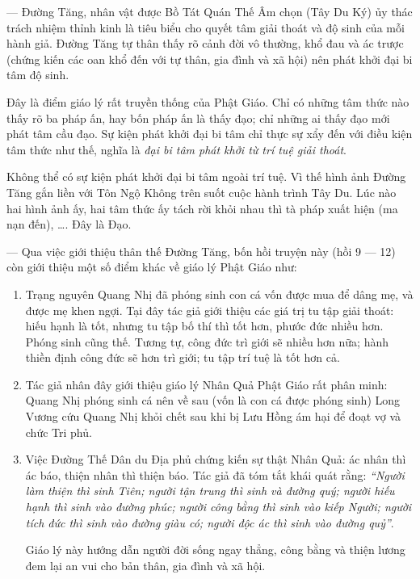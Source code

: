 --- Đường Tăng, nhân vật được Bồ Tát Quán Thế Âm chọn (Tây Du Ký) ủy thác trách nhiệm thỉnh kinh là tiêu biểu cho quyết tâm giải thoát và độ sinh của mỗi hành giả. Đường Tăng tự thân thấy rõ cảnh đời vô thường, khổ đau và ác trược (chứng kiến các oan khổ đến với tự thân, gia đình và xã hội) nên phát khởi đại bi tâm độ sinh.

Đây là điểm giáo lý rất truyền thống của Phật Giáo. Chỉ có những tâm thức nào thấy rõ ba pháp ấn, hay bốn pháp ấn là thấy đạo; chỉ những ai thấy đạo mới phát tâm cầu đạo. Sự kiện phát khởi đại bi tâm chỉ thực sự xẩy đến với điều kiện tâm thức như thế, nghĩa là \emph{đại bi tâm phát khởi từ trí tuệ giải thoát}.

Không thể có sự kiện phát khởi đại bi tâm ngoài trí tuệ. Vì thế hình ảnh Đường Tăng gắn liền với Tôn Ngộ Không trên suốt cuộc hành trình Tây Du. Lúc nào hai hình ảnh ấy, hai tâm thức ấy tách rời khỏi nhau thì tà pháp xuất hiện (ma nạn đến), \ldots. Đây là Đạo.

--- Qua việc giới thiệu thân thế Đường Tăng, bốn hồi truyện này (hồi 9 --- 12) còn giới thiệu một số điểm khác về giáo lý Phật Giáo như:

\begin{enumerate}[label=\itshape\alph*\upshape/]

    \item Trạng nguyên Quang Nhị đã phóng sinh con cá vốn được mua để dâng mẹ, và được mẹ khen ngợi. Tại đây tác giả giới thiệu các giá trị tu tập giải thoát: hiếu hạnh là tốt, nhưng tu tập bố thí thì tốt hơn, phước đức nhiều hơn. Phóng sinh cũng thế. Tương tự, công đức trì giới sẽ nhiều hơn nữa; hành thiền định công đức sẽ hơn trì giới; tu tập trí tuệ là tốt hơn cả.

    \item Tác giả nhân đây giới thiệu giáo lý Nhân Quả Phật Giáo rất phân minh: Quang Nhị phóng sinh cá nên về sau (vốn là con cá được phóng sinh) Long Vương cứu Quang Nhị khỏi chết sau khi bị Lưu Hồng ám hại để đoạt vợ và chức Tri phủ.

    \item Việc Đường Thế Dân du Địa phủ chứng kiến sự thật Nhân Quả: ác nhân thì ác báo, thiện nhân thì thiện báo. Tác giả đã tóm tắt khái quát rằng: \emph{``Người làm thiện thì sinh Tiên; người tận trung thì sinh và đường quý; người hiếu hạnh thì sinh vào đường phúc; người công bằng thì sinh vào kiếp Người; người tích đức thì sinh vào đường giàu có; người độc ác thì sinh vào đường quỷ''}.

    Giáo lý này hướng dẫn người đời sống ngay thẳng, công bằng và thiện lương đem lại an vui cho bản thân, gia đình và xã hội.
\end{enumerate}

